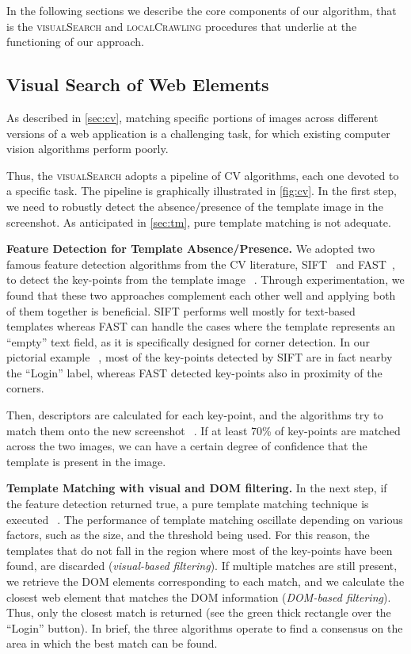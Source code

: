 In the following sections we describe the core components of our algorithm, that is the \textsc{visualSearch} and \textsc{localCrawling} procedures that underlie at the functioning of our approach.

\subsection{Visual Search of Web Elements}

As described in \autoref{sec:cv}, matching specific portions of images across different versions of a web application is a challenging task, for which existing computer vision algorithms perform poorly. 

Thus, the \textsc{visualSearch} adopts a pipeline of CV algorithms, each one devoted to a specific task. The pipeline is graphically illustrated in \autoref{fig:cv}. In the first step, we need to robustly detect the absence/presence of the template image in the screenshot. As anticipated in \autoref{sec:tm}, pure template matching is not adequate. %

\noindent
\textbf{Feature Detection for Template Absence/Presence.}
We adopted two famous feature detection algorithms from the CV literature, SIFT~\cite{Lowe1999,Lowe2004} and FAST~\cite{rosten2005tracking,rosten2008faster}, to detect the key-points from the template image~\textcircled{}. Through experimentation, we found that these two approaches complement each other well and applying both of them together is beneficial. SIFT performs well mostly for text-based templates whereas FAST can handle the cases where the template represents an ``empty'' text field, as it is specifically designed for corner detection. In our pictorial example~\textcircled{}, most of the key-points detected by SIFT are in fact nearby the ``Login'' label, whereas FAST detected key-points also in proximity of the corners.
 
Then, descriptors are calculated for each key-point, and the algorithms try to match them onto the new screenshot~\textcircled{}.
If at least 70\% of key-points are matched across the two images, we can have a certain degree of confidence that the template is present in the image. 

\noindent
\textbf{Template Matching with visual and DOM filtering.}
In the next step, if the feature detection returned true, a pure template matching technique is executed~\textcircled{}. The performance of template matching oscillate depending on various factors, such as the size, and the threshold being used. For this reason, the templates that do not fall in the region where most of the key-points have been found, are discarded (\textit{visual-based filtering}). If multiple matches are still present, we retrieve the DOM elements corresponding to each match, and we calculate the closest web element that matches the DOM information (\textit{DOM-based filtering}).
Thus, only the closest match is returned (see the green thick rectangle over the ``Login'' button). In brief, the three algorithms operate to find a consensus on the area in which the best match can be found. 

